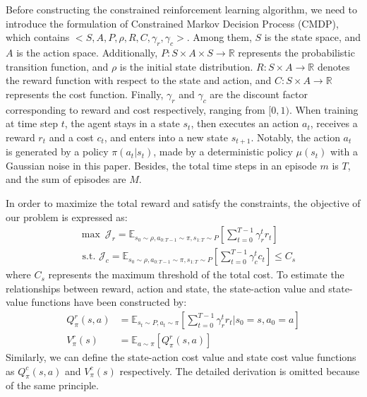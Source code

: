 \documentclass{article}
\begin{document}
Before constructing the constrained reinforcement learning algorithm, we need to introduce the formulation of Constrained Markov Decision Process (CMDP), which contains $<S,A,P,\rho,R,C,\gamma_r,\gamma_c>$. Among them, $S$ is the state space, and $A$ is the action space. Additionally, $P:S\times A \times S \rightarrow \mathbb R$ represents the probabilistic transition function, and $\rho$ is the initial state distribution. $R: S \times A \rightarrow \mathbb R$ denotes the reward function with respect to the state and action, and $C:S \times A \rightarrow \mathbb R$ represents the cost function. Finally, $\gamma_r$ and $\gamma_c$ are the discount factor corresponding to reward and cost respectively, ranging from $[0,1)$. When training at time step $t$, the agent stays in a state $s_t$, then executes an action $a_t$, receives a reward $r_t$ and a cost $c_t$, and enters into a new state $s_{t+1}$. Notably, the action $a_t$ is generated by a policy $\pi(a_t|s_t)$, made by a deterministic policy $\mu(s_t)$ with a Gaussian noise in this paper. Besides, the total time steps in an episode $m$ is $T$, and the sum of episodes are $M$.


In order to maximize the total reward and satisfy the constraints, the objective of our problem is expressed as:
\begin{equation}
\label{eq4}
\begin{split}
& \max \ \mathcal J_r = {\mathbb E}_{s_0 \sim \rho,a_{0:T-1}\sim\pi,s_{1:T}\sim P} [\sum\nolimits_{t=0}^{T-1} \gamma_r^t r_t] \\ 
& \text { s.t. } \mathcal J_c = {\mathbb E}_{s_0 \sim \rho,a_{0:T-1}\sim\pi,s_{1:T}\sim P} [\sum\nolimits_{t=0}^{T-1} \gamma_c^t c_t]\leq C_s
\end{split}
\end{equation}
where $C_s$ represents the maximum threshold of the total cost. To estimate the relationships between reward, action and state, the state-action value and state-value functions have been constructed by:
\begin{equation}
  \label{eq5}
\begin{split}
Q^r_\pi(s,a)&={\mathbb E}_{s_t \sim P, a_t\sim \pi} [\sum\nolimits_{t=0}^{T-1} \gamma_r^t r_t| s_0= s,a_0=a] \\
V^r_\pi(s)&= {\mathbb E}_{a\sim \pi} [Q^r_\pi(s,a)]
\end{split}
\end{equation}
Similarly, we can define the state-action cost value and state cost value functions as $Q^c_\pi(s,a) $ and $V^c_\pi(s)$ respectively. The detailed derivation is omitted because of the same principle. 
\end{document}
